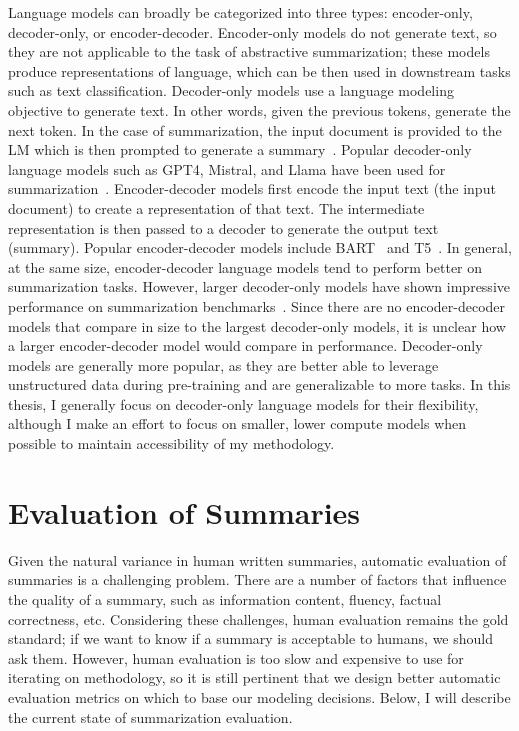 Language models can broadly be categorized into three types: encoder-only, decoder-only, or encoder-decoder. Encoder-only models do not generate text, so they are not applicable to the task of abstractive summarization; these models produce representations of language, which can be then used in downstream tasks such as text classification. Decoder-only models use a language modeling objective to generate text. In other words, given the previous tokens, generate the next token. In the case of summarization, the input document is provided to the LM which is then prompted to generate a summary~\cite{Zhang2023BenchmarkingLL}. Popular decoder-only language models such as GPT4, Mistral, and Llama have been used for summarization~\cite{Zhang2023BenchmarkingLL,cachola-etal-2024-knowledge,Laskar2023BuildingRM,Laskar2023ASS}. Encoder-decoder models first encode the input text (the input document) to create a representation of that text. The intermediate representation is then passed to a decoder to generate the output text (summary). Popular encoder-decoder models include BART~\cite{lewis2020bart} and T5~\cite{Raffel2019ExploringTL}. In general, at the same size, encoder-decoder language models tend to perform better on summarization tasks. However, larger decoder-only models have shown impressive performance on summarization benchmarks~\cite{goyal2022news,Zhang2023BenchmarkingLL}. Since there are no encoder-decoder models that compare in size to the largest decoder-only models, it is unclear how a larger encoder-decoder model would compare in performance. Decoder-only models are generally more popular, as they are better able to leverage unstructured data during pre-training and are generalizable to more tasks.
In this thesis, I generally focus on decoder-only language models for their flexibility, although I make an effort to focus on smaller, lower compute models when possible to maintain accessibility of my methodology. 

\section{Evaluation of Summaries}\label{sec:background-eval-summaries}
Given the natural variance in human written summaries, automatic evaluation of summaries is a challenging problem. There are a number of factors that influence the quality of a summary, such as information content, fluency, factual correctness, etc. Considering these challenges, human evaluation remains the gold standard; if we want to know if a summary is acceptable to humans, we should ask them. However, human evaluation is too slow and expensive to use for iterating on methodology, so it is still pertinent that we design better automatic evaluation metrics on which to base our modeling decisions. Below, I will describe the current state of summarization evaluation. 

